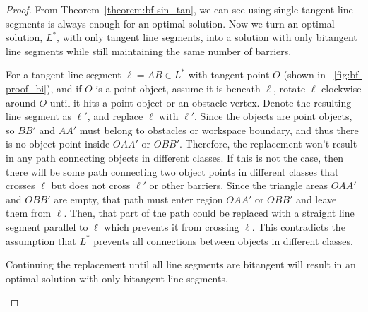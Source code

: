 \begin{proof}
From Theorem~\ref{theorem:bf-sin_tan}, we can see using single tangent line segments is always enough
for an optimal solution. 
Now we turn an optimal solution, $L^*$, with only tangent line segments, into
a solution with only bitangent line segments while still maintaining the same number of barriers. 

For a tangent line segment $\ell=AB\in L^*$ with tangent point $O$ (shown in ~\ref{fig:bf-proof_bi}), and if $O$ is a point object, assume it is beneath $\ell$,
rotate $\ell$ clockwise around $O$ until it hits a point object or an obstacle vertex.
Denote the resulting line segment as $\ell'$, and replace $\ell$ with $\ell'$.
Since the objects are point objects, so $BB'$ and $AA'$ must belong to obstacles or workspace boundary, 
and thus there is no object point inside $OAA'$ or $OBB'$. 
Therefore, the replacement won't result in
any path connecting objects in different classes.
If this is not the case, then there will be some path connecting two object points in different classes that crosses $\ell$ but does not cross $\ell'$ or other barriers. 
Since the triangle areas $OAA'$ and $OBB'$ are empty, that path must enter region $OAA'$ or $OBB'$ and leave them from $\ell$. Then, that part of the path could be replaced with a straight line segment parallel to $\ell$ which prevents it from crossing $\ell$. This contradicts the assumption that $L^*$ prevents all connections between objects in different classes. %

Continuing the replacement until all line segments are bitangent will result in an optimal solution with only bitangent line segments.

\begin{figure}[ht]
    \centering
\end{figure}
\end{proof}
